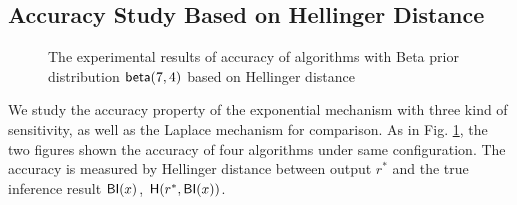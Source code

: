 \subsection{Accuracy Study Based on Hellinger Distance}

\begin{figure}
\begin{center}
\centering
\caption{The experimental results of accuracy of algorithms with Beta prior distribution $\mathsf{beta}(7,4)$ based on Hellinger distance}
\label{fig_beta_hellinger}
\end{center}
\end{figure}

We study the accuracy property of the exponential mechanism with three kind of sensitivity, as well as the Laplace mechanism for comparison. As in Fig. \ref{fig_beta_hellinger}, the two figures shown the accuracy of four algorithms under same configuration. The accuracy is measured by Hellinger distance between output $r^*$ and the true inference result $\mathsf{BI}(x)$, $\mathsf{H}(r^*, \mathsf{BI}(x))$.

